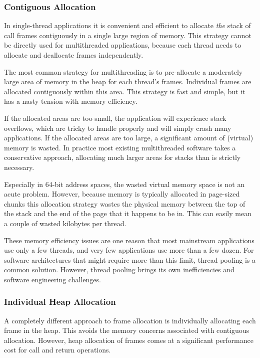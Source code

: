 \documentclass[pldi,10pt,preprint]{sigplanconf-pldi16}
\begin{document}
\subsubsection{Contiguous Allocation}

In single-thread applications it is convenient and efficient to allocate \emph{the} stack of call frames contiguously in a single large region of memory.
This strategy cannot be directly used for multithreaded applications, because each thread needs to allocate and deallocate frames independently.

The most common strategy for multithreading is to pre-allocate a moderately large area of memory in the heap for each thread's frames.
Individual frames are allocated contiguously within this area.
This strategy is fast and simple, but it has a nasty tension with memory efficiency.

If the allocated areas are too small, the application will experience stack overflows, which are tricky to handle properly and will simply crash many applications.
If the allocated areas are too large, a significant amount of (virtual) memory is wasted.
In practice most existing multithreaded software takes a conservative approach, allocating much larger areas for stacks than is strictly necessary.

Especially in 64-bit address spaces, the wasted virtual memory space is not an acute problem.
However, because memory is typically allocated in page-sized chunks this allocation strategy wastes the physical memory between the top of the stack and the end of the page that it happens to be in.
This can easily mean a couple of wasted kilobytes per thread.

These memory efficiency issues are one reason that most mainstream applications use only a few threads, and very few applications use more than a few dozen.
For software architectures that might require more than this limit, thread pooling is a common solution.
However, thread pooling brings its own inefficiencies and software engineering challenges.

\subsubsection{Individual Heap Allocation}

A completely different approach to frame allocation is individually allocating each frame in the heap.
This avoids the memory concerns associated with contiguous allocation.
However, heap allocation of frames comes at a significant performance cost for call and return operations.
\end{document}
